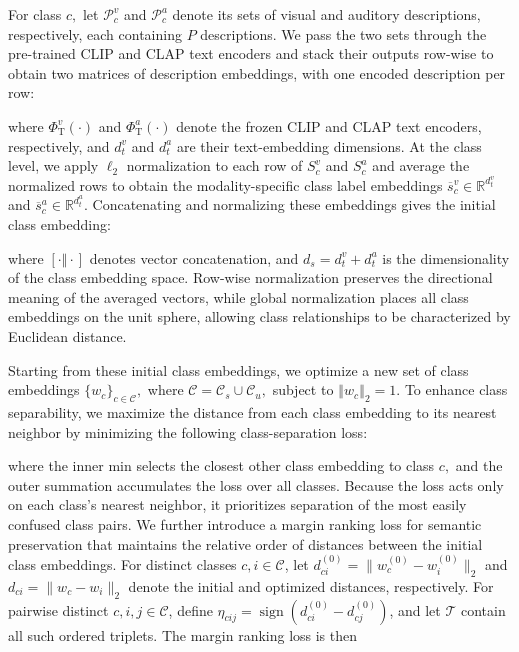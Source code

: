 For class $c,$ let ${\mathcal{P}}_{c}^{v}$ and ${\mathcal{P}}_{c}^{a}$ denote its sets of visual and auditory descriptions, respectively, each containing $P$ descriptions. We pass the two sets through the pre-trained CLIP and CLAP text encoders and stack their outputs row-wise to obtain two matrices of description embeddings, with one encoded description per row:




\noindent\unskip where ${\Phi }_{\mathrm{T}}^{v}(\cdot )$ and ${\Phi }_{\mathrm{T}}^{a}(\cdot )$ denote the frozen CLIP and CLAP text encoders, respectively, and ${d}_{t}^{v}$ and ${d}_{t}^{a}$ are their text-embedding dimensions. At the class level, we apply ${\ell }_{2}$ normalization to each row of ${S}_{c}^{v}$ and ${S}_{c}^{a}$ and average the normalized rows to obtain the modality-specific class label embeddings ${\overline{s}}_{c}^{v}\in {\mathbb{R}}^{{d}_{t}^{v}}$ and ${\overline{s}}_{c}^{a}\in {\mathbb{R}}^{{d}_{t}^{a}}.$ Concatenating and normalizing these embeddings gives the initial class embedding:


\noindent\unskip where $[\cdot \Vert \cdot ]$ denotes vector concatenation, and ${d}_{s}={d}_{t}^{v}+{d}_{t}^{a}$ is the dimensionality of the class embedding space. Row-wise normalization preserves the directional meaning of the averaged vectors, while global normalization places all class embeddings on the unit sphere, allowing class relationships to be characterized by Euclidean distance.

Starting from these initial class embeddings, we optimize a new set of class embeddings $\{{w}_{c}{\}}_{c\in \mathcal{C}},$ where $\mathcal{C}={\mathcal{C}}_{s}\cup {\mathcal{C}}_{u},$ subject to ${\left\Vert {w}_{c}\right\Vert }_{2}=1.$ To enhance class separability, we maximize the distance from each class embedding to its nearest neighbor by minimizing the following class-separation loss:


\noindent\unskip where the inner $\mathrm{min}$ selects the closest other class embedding to class $c,$ and the outer summation accumulates the loss over all classes. Because the loss acts only on each class\textquoteright{}s nearest neighbor, it prioritizes separation of the most easily confused class pairs. We further introduce a margin ranking loss for semantic preservation that maintains the relative order of distances between the initial class embeddings. For distinct classes $c,i\in\mathcal{C}$, let $d_{ci}^{(0)}=\lVert w_c^{(0)}-w_i^{(0)}\rVert_2$ and $d_{ci}=\lVert w_c-w_i\rVert_2$ denote the initial and optimized distances, respectively. For pairwise distinct $c,i,j\in\mathcal{C}$, define $\eta_{cij}=\operatorname{sign}(d_{ci}^{(0)}-d_{cj}^{(0)})$, and let $\mathcal{T}$ contain all such ordered triplets. The margin ranking loss is then

